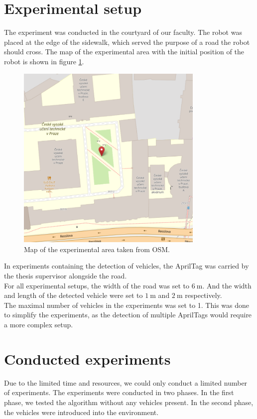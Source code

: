 \section{Experimental setup}
    The experiment was conducted in the courtyard of our faculty. The robot was placed at the edge of the sidewalk, which served the purpose of a road the robot should cross. The map of the experimental area with the initial position of the robot is shown in figure \ref{fig:map}.\\
    \begin{figure}[ht]
        \centering
        \includegraphics[width=0.8\textwidth]{images/map.png}
        \caption{Map of the experimental area taken from OSM.}
        \label{fig:map}
    \end{figure}
    In experiments containing the detection of vehicles, the AprilTag was carried by the thesis supervisor alongside the road.\\
    For all experimental setups, the width of the road was set to $6\:\si{\m}$. And the width and length of the detected vehicle were set to $1\:\si{\m}$ and $2\:\si{\m}$ respectively.\\
    The maximal number of vehicles in the experiments was set to 1. This was done to simplify the experiments, as the detection of multiple AprilTags would require a more complex setup.

\section{Conducted experiments}
    Due to the limited time and resources, we could only conduct a limited number of experiments. The experiments were conducted in two phases. In the first phase, we tested the algorithm without any vehicles present. In the second phase, the vehicles were introduced into the environment.

